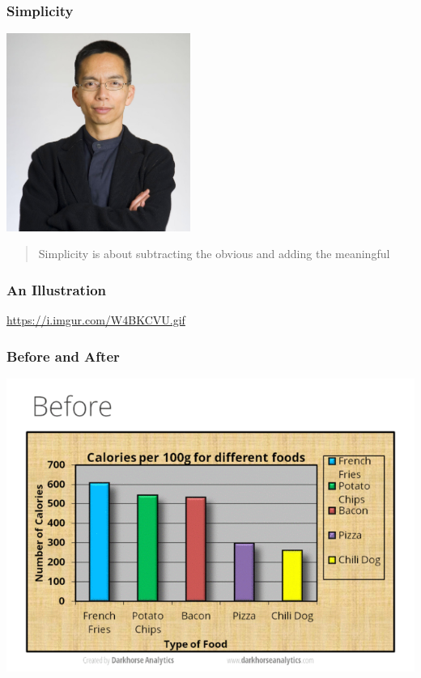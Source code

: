 \documentclass{beamer}
\begin{document}
\begin{frame}
\frametitle{Simplicity}
	\begin{center}
		\includegraphics[width = 0.45\textwidth]{./images/johnMaeda.jpg}\\
	\end{center}
	\begin{quote}
		Simplicity is about subtracting the obvious and adding the meaningful
	\end{quote}
\end{frame}

\begin{frame}
\frametitle{An Illustration}
	\url{https://i.imgur.com/W4BKCVU.gif}	
\end{frame}

\begin{frame}
\frametitle{Before and After}
	\centering
	\includegraphics[width = \textwidth, height = 0.8\textheight]{./images/designBefore.png}
\end{frame}
\end{document}
